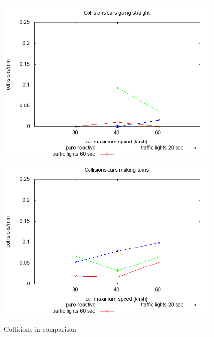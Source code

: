 \begin{figure}
\centering
\includegraphics[scale=0.35]{img/plot_collisionsstraight}
\includegraphics[scale=0.35]{img/plot_collisionsturns}
\caption{Collisions in comparison}
\label{fig:collisions}
\end{figure}




